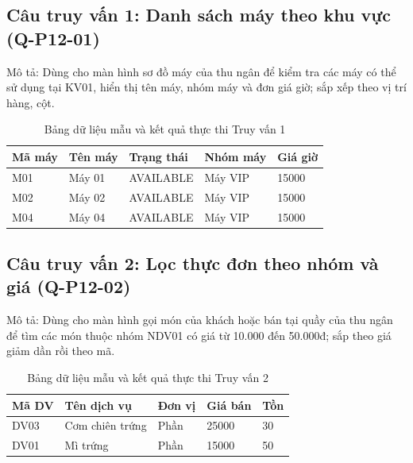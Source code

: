 \subsection{Câu truy vấn 1: Danh sách máy theo khu vực (Q-P12-01)}
Mô tả: Dùng cho màn hình sơ đồ máy của thu ngân để kiểm tra các máy có thể sử dụng tại KV01, hiển thị tên máy, nhóm máy và đơn giá giờ; sắp xếp theo vị trí hàng, cột.
\begin{table}[H]
\centering\small
\caption{Bảng dữ liệu mẫu và kết quả thực thi Truy vấn 1}
\begin{tabularx}{\linewidth}{@{}XXXXX@{}}\toprule
\textbf{Mã máy} & \textbf{Tên máy} & \textbf{Trạng thái} & \textbf{Nhóm máy} & \textbf{Giá giờ}\\\midrule
M01 & Máy 01 & AVAILABLE & Máy VIP & 15000\\
M02 & Máy 02 & AVAILABLE & Máy VIP & 15000\\
M04 & Máy 04 & AVAILABLE & Máy VIP & 15000\\
\bottomrule\end{tabularx}\end{table}
\subsection{Câu truy vấn 2: Lọc thực đơn theo nhóm và giá (Q-P12-02)}
Mô tả: Dùng cho màn hình gọi món của khách hoặc bán tại quầy của thu ngân để tìm các món thuộc nhóm NDV01 có giá từ 10.000 đến 50.000đ; sắp theo giá giảm dần rồi theo mã.
\begin{table}[H]
\centering\small
\caption{Bảng dữ liệu mẫu và kết quả thực thi Truy vấn 2}
\begin{tabularx}{\linewidth}{@{}XXXXX@{}}\toprule
\textbf{Mã DV} & \textbf{Tên dịch vụ} & \textbf{Đơn vị} & \textbf{Giá bán} & \textbf{Tồn}\\\midrule
DV03 & Cơm chiên trứng & Phần & 25000 & 30\\
DV01 & Mì trứng & Phần & 15000 & 50\\
\bottomrule\end{tabularx}\end{table}

